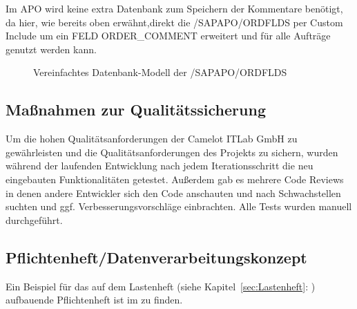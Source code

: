 Im \ac{APO} wird keine extra Datenbank zum Speichern der Kommentare benötigt, da hier, wie bereits oben erwähnt,direkt die /SAPAPO/ORDFLDS per Custom Include um ein FELD ORDER\_COMMENT erweitert und für alle Aufträge genutzt werden kann.  

\begin{figure}[htb]
	\centering
	\caption{Vereinfachtes Datenbank-Modell der /SAPAPO/ORDFLDS}
	\label{fig:APO01}
\end{figure} 

\subsection{Maßnahmen zur Qualitätssicherung}
\label{sec:Qualitaetssicherung}
Um die hohen Qualitätsanforderungen der Camelot ITLab GmbH zu gewährleisten und die Qualitätsanforderungen des Projekts zu sichern, wurden während der laufenden Entwicklung nach jedem Iterationsschritt die neu eingebauten Funktionalitäten getestet. Außerdem gab es mehrere Code Reviews in denen andere Entwickler sich den Code anschauten und nach Schwachstellen suchten und ggf. Verbesserungsvorschläge einbrachten. Alle Tests wurden manuell durchgeführt.  

\subsection{Pflichtenheft/Datenverarbeitungskonzept}
\label{sec:Pflichtenheft}
Ein Beispiel für das auf dem Lastenheft (siehe Kapitel~\ref{sec:Lastenheft}: ) aufbauende Pflichtenheft ist im  zu finden.


